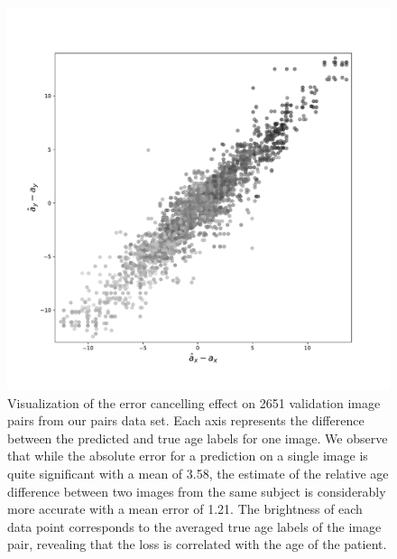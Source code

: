 \begin{figure}
	\centering
	\includegraphics[width=.8\linewidth]{images/age_plots/xr_yr} 
	\vspace*{-15pt}
	\caption{Visualization of the error cancelling effect on 2651 validation image pairs from our pairs data set. Each axis represents the difference between the predicted and true age labels for one image. We observe that while the absolute error for a prediction on a single image is quite significant with a mean of 3.58, the estimate of the relative age difference between two images from the same subject is considerably more accurate with a mean error of 1.21. The brightness of each data point corresponds to the averaged true age labels of the image pair, revealing that the loss is correlated with the age of the patient.}
	\label{fig:expregxryr}
\end{figure}

